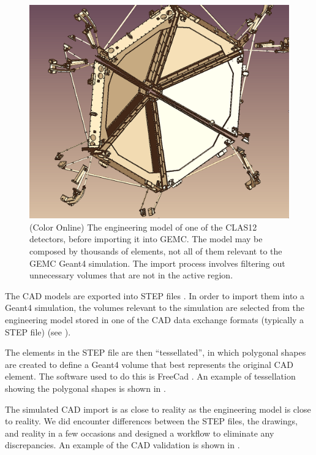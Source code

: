 \begin{figure}[h]
	\centering
	\includegraphics[width=1.0\columnwidth,keepaspectratio]{img/cadSelection.png}
	\caption{(Color Online)  The engineering model of one of the CLAS12 detectors, before importing it into GEMC.
             The model may be composed by thousands of elements, not all of them relevant to the GEMC Geant4 simulation.
             The import process involves filtering out unnecessary volumes that are not in the active region.}
	\label{fig:cadSelection}
\end{figure}

The CAD models are exported into STEP files \cite{stepFiles}.
In order to import them into a Geant4 simulation, the volumes relevant to the simulation are selected from the engineering
model stored in one of the CAD data exchange formats (typically a STEP file) \cite{cadExchange} (see ).


The elements in the STEP file are then ``tessellated'', in which polygonal shapes are created to define a Geant4 volume
that best represents the original CAD element.
The software used to do this is FreeCad \cite{freeCad}. An example of tessellation showing the polygonal shapes
is shown in .

The simulated CAD import is as close to reality as the engineering model is close to reality.
We did encounter differences between the STEP files, the drawings, and reality in a few occasions and designed
a workflow to eliminate any discrepancies.
An example of the CAD validation is shown in .

